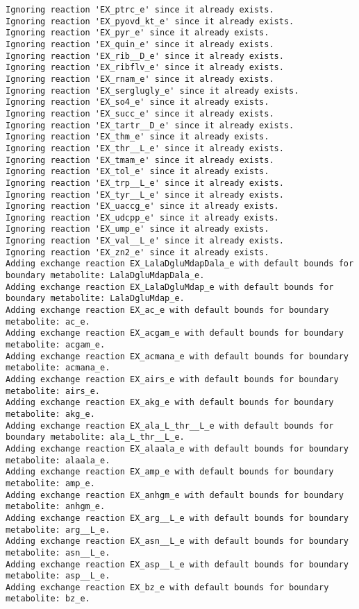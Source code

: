 \documentclass[
  letterpaper,
  DIV=11,
  numbers=noendperiod]{scrartcl}
\begin{document}
\begin{verbatim}
Ignoring reaction 'EX_ptrc_e' since it already exists.
Ignoring reaction 'EX_pyovd_kt_e' since it already exists.
Ignoring reaction 'EX_pyr_e' since it already exists.
Ignoring reaction 'EX_quin_e' since it already exists.
Ignoring reaction 'EX_rib__D_e' since it already exists.
Ignoring reaction 'EX_ribflv_e' since it already exists.
Ignoring reaction 'EX_rnam_e' since it already exists.
Ignoring reaction 'EX_serglugly_e' since it already exists.
Ignoring reaction 'EX_so4_e' since it already exists.
Ignoring reaction 'EX_succ_e' since it already exists.
Ignoring reaction 'EX_tartr__D_e' since it already exists.
Ignoring reaction 'EX_thm_e' since it already exists.
Ignoring reaction 'EX_thr__L_e' since it already exists.
Ignoring reaction 'EX_tmam_e' since it already exists.
Ignoring reaction 'EX_tol_e' since it already exists.
Ignoring reaction 'EX_trp__L_e' since it already exists.
Ignoring reaction 'EX_tyr__L_e' since it already exists.
Ignoring reaction 'EX_uaccg_e' since it already exists.
Ignoring reaction 'EX_udcpp_e' since it already exists.
Ignoring reaction 'EX_ump_e' since it already exists.
Ignoring reaction 'EX_val__L_e' since it already exists.
Ignoring reaction 'EX_zn2_e' since it already exists.
Adding exchange reaction EX_LalaDgluMdapDala_e with default bounds for boundary metabolite: LalaDgluMdapDala_e.
Adding exchange reaction EX_LalaDgluMdap_e with default bounds for boundary metabolite: LalaDgluMdap_e.
Adding exchange reaction EX_ac_e with default bounds for boundary metabolite: ac_e.
Adding exchange reaction EX_acgam_e with default bounds for boundary metabolite: acgam_e.
Adding exchange reaction EX_acmana_e with default bounds for boundary metabolite: acmana_e.
Adding exchange reaction EX_airs_e with default bounds for boundary metabolite: airs_e.
Adding exchange reaction EX_akg_e with default bounds for boundary metabolite: akg_e.
Adding exchange reaction EX_ala_L_thr__L_e with default bounds for boundary metabolite: ala_L_thr__L_e.
Adding exchange reaction EX_alaala_e with default bounds for boundary metabolite: alaala_e.
Adding exchange reaction EX_amp_e with default bounds for boundary metabolite: amp_e.
Adding exchange reaction EX_anhgm_e with default bounds for boundary metabolite: anhgm_e.
Adding exchange reaction EX_arg__L_e with default bounds for boundary metabolite: arg__L_e.
Adding exchange reaction EX_asn__L_e with default bounds for boundary metabolite: asn__L_e.
Adding exchange reaction EX_asp__L_e with default bounds for boundary metabolite: asp__L_e.
Adding exchange reaction EX_bz_e with default bounds for boundary metabolite: bz_e.

\end{verbatim}
\end{document}

